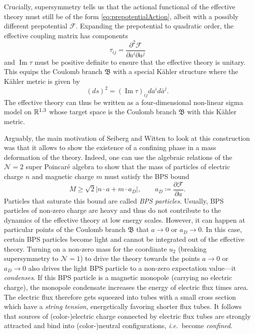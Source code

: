 Crucially, supersymmetry tells us that the actional functional of the effective theory must still be of the form \eqref{eq:prepotentialAction}, albeit with a possibly different prepotential $\mathcal{F}$. Expanding the prepotential to quadratic order, the effective coupling matrix has components
\begin{equation}
	\tau_{ij} = \frac{\partial^2 \mathcal{F}}{\partial a^i \partial a^j}
\end{equation}
and $\operatorname{Im} \tau$ must be positive definite to ensure that the effective theory is unitary. This equips the Coulomb branch $\mathfrak{B}$ with a special Kähler structure where the Kähler metric is given by
\begin{equation}
	(ds)^2 = (\operatorname{Im} \tau)_{ij} da^i d\bar a^j.
\end{equation}
The effective theory can thus be written as a four-dimensional non-linear sigma model on $\mathbb{R}^{1,3}$ whose target space is the Coulomb branch $\mathfrak{B}$ with this Kähler metric.

Arguably, the main motivation of Seiberg and Witten to look at this construction was that it allows to show the existence of a confining phase in a mass deformation of the theory. Indeed, one can use the algebraic relations of the $\mathcal{N}=2$ super Poincaré algebra to show that the mass of particles of electric charge $n$ and magnetic charge $m$ must satisfy the BPS bound \cite{witten_supersymmetry_1978}
\begin{equation}
	M \geq \sqrt{2} |n \cdot a + m \cdot a_D|, \qquad a_D \coloneq \frac{\partial \mathcal{F}}{\partial a}.
\end{equation}
Particles that saturate this bound are called \emph{BPS particles}. Usually, BPS particles of non-zero charge are heavy and thus do not contribute to the dynamics of the effective theory at low energy scales. However, it can happen at particular points of the Coulomb branch $\mathfrak{B}$ that $a \to 0$ or $a_D \to 0$. In this case, certain BPS particles become light and cannot be integrated out of the effective theory. Turning on a non-zero mass for the coordinate $u_2$ (breaking supersymmetry to $\mathcal{N}=1$) to drive the theory towards the points $a \to 0$ or $a_D \to 0$ also drives the light BPS particle to a non-zero expectation value---it \emph{condenses}. If this BPS particle is a magnetic monopole (carrying no electric charge), the monopole condensate increases the energy of electric flux times area. The electric flux therefore gets squeezed into tubes with a small cross section which have a \emph{string tension}, energetically favoring shorter flux tubes. It follows that sources of (color-)electric charge connected by electric flux tubes are strongly attracted and bind into (color-)neutral configurations, \emph{i.e.\ }become \emph{confined}.

